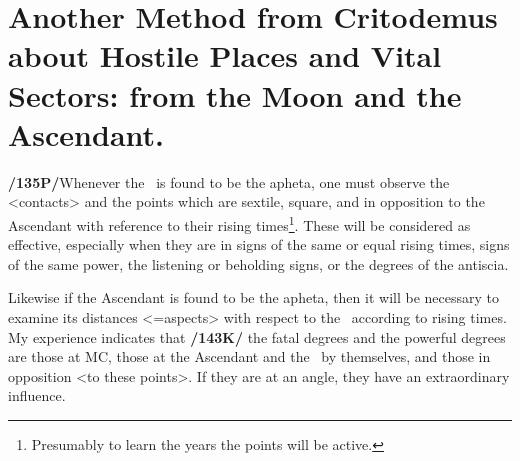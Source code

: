 \section{Another Method from Critodemus about Hostile Places and Vital Sectors: from the Moon and the Ascendant.}

\textbf{/135P/}Whenever the \Moon\, is found to be the apheta, one must observe the <contacts> and the points which are sextile, square, and in opposition to the Ascendant with reference to their rising times\footnote{Presumably to learn the years the points will be active.}. These will be considered as effective, especially when they are in signs of the same or equal rising times, signs of the same power, the listening or beholding signs, or the degrees of the antiscia. 

Likewise if the Ascendant is found to be the apheta, then it will be necessary to examine its distances <=aspects> with respect to the \Moon\, according to rising times. My experience indicates that \textbf{/143K/} the fatal degrees and the powerful degrees are those at MC, those at the Ascendant and the \Moon\, by themselves, and those in opposition <to these points>. If they are at an angle, they have an extraordinary influence.

\newpage